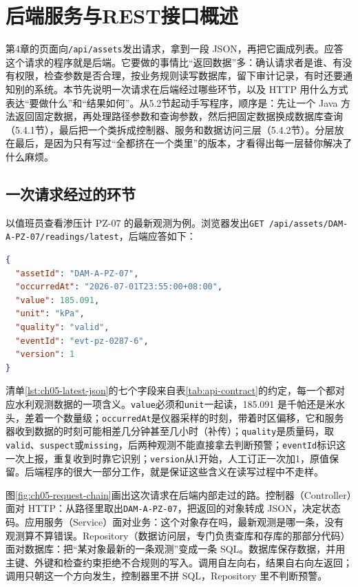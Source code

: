 \section{后端服务与REST接口概述}


第4章的页面向\texttt{/api/assets}发出请求，拿到一段 JSON，再把它画成列表。应答这个请求的程序就是后端。它要做的事情比“返回数据”多：确认请求者是谁、有没有权限，检查参数是否合理，按业务规则读写数据库，留下审计记录，有时还要通知别的系统。本节先说明一次请求在后端经过哪些环节，以及 HTTP 用什么方式表达“要做什么”和“结果如何”。从5.2节起动手写程序，顺序是：先让一个 Java 方法返回固定数据，再处理路径参数和查询参数，然后把固定数据换成数据库查询（5.4.1节），最后把一个类拆成控制器、服务和数据访问三层（5.4.2节）。分层放在最后，是因为只有写过“全都挤在一个类里”的版本，才看得出每一层替你解决了什么麻烦。

\subsection{一次请求经过的环节}

以值班员查看渗压计 PZ-07 的最新观测为例。浏览器发出\texttt{GET /api/assets/}\allowbreak\texttt{DAM-A-PZ-07/}\allowbreak\texttt{readings/latest}，后端应答如下：

\begin{lstlisting}[label={lst:ch05-latest-json},language=JSON,caption={最新观测接口的一次应答（状态码 200）}]
{
  "assetId": "DAM-A-PZ-07",
  "occurredAt": "2026-07-01T23:55:00+08:00",
  "value": 185.091,
  "unit": "kPa",
  "quality": "valid",
  "eventId": "evt-pz-0287-6",
  "version": 1
}
\end{lstlisting}

清单\ref{lst:ch05-latest-json}的七个字段来自表\ref{tab:api-contract}的约定，每一个都对应水利观测数据的一项含义。\texttt{value}必须和\texttt{unit}一起读，185.091 是千帕还是米水头，差着一个数量级；\texttt{occurredAt}是仪器采样的时刻，带着时区偏移，它和服务器收到数据的时刻可能相差几分钟甚至几小时（补传）；\texttt{quality}是质量码，取\texttt{valid}、\texttt{suspect}或\texttt{missing}，后两种观测不能直接拿去判断预警；\texttt{eventId}标识这一次上报，重复收到时靠它识别；\texttt{version}从1开始，人工订正一次加1，原值保留。后端程序的很大一部分工作，就是保证这些含义在读写过程中不走样。

图\ref{fig:ch05-request-chain}画出这次请求在后端内部走过的路。控制器（Controller）面对 HTTP：从路径里取出\texttt{DAM-A-PZ-07}，把返回的对象转成 JSON，决定状态码。应用服务（Service）面对业务：这个对象存在吗，最新观测是哪一条，没有观测算不算错误。Repository（数据访问层，专门负责查库和存库的那部分代码）面对数据库：把“某对象最新的一条观测”变成一条 SQL。数据库保存数据，并用主键、外键和检查约束拒绝不合规则的写入。调用自左向右，结果自右向左返回；调用只朝这一个方向发生，控制器里不拼 SQL，Repository 里不判断预警。


